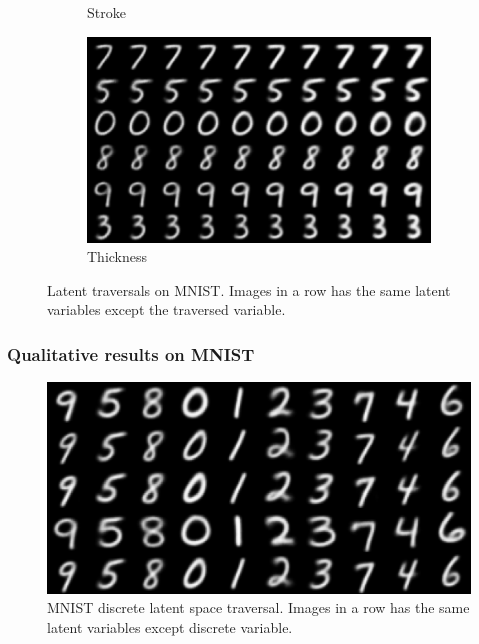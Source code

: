 \documentclass[10pt,mathserif]{beamer}
\begin{document}
\begin{frame}
\begin{figure}[bp]
\begin{subfigure}[t]{0.48\linewidth}
\caption{Stroke}
\end{subfigure}\hspace{0.005\linewidth}
\begin{subfigure}[t]{0.48\linewidth}
\centering
\includegraphics[width=0.8\linewidth]{dis_asset/mnist_thickness.png}
\caption{Thickness}
\end{subfigure}
\caption{ Latent traversals on MNIST. Images in a row has the same latent variables except the traversed variable.}
\end{figure}
\end{frame}

\begin{frame}
\frametitle{Qualitative results on MNIST}
\begin{figure}[bp]
\centering
\includegraphics[width=0.8\linewidth]{dis_asset/mnist_digit.png}
\caption{MNIST discrete latent space traversal. Images in a row has the same latent variables except discrete variable.}
\end{figure}
\end{frame}
\end{document}
